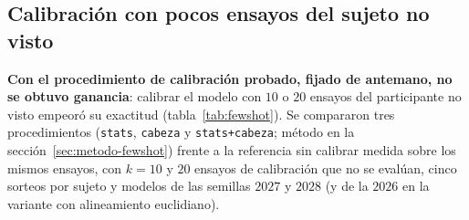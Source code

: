 \subsection{Calibración con pocos ensayos del sujeto no visto}
\label{sec:fewshot}

\textbf{Con el procedimiento de calibración probado, fijado de antemano, no se obtuvo ganancia}: calibrar el
modelo con $10$ o $20$ ensayos del participante no visto empeoró su exactitud (tabla~\ref{tab:fewshot}).
Se compararon tres procedimientos (\texttt{stats}, \texttt{cabeza} y \texttt{stats+cabeza}; método en la
sección~\ref{sec:metodo-fewshot}) frente a la referencia sin calibrar medida sobre los mismos ensayos, con
$k = 10$ y $20$ ensayos de calibración que no se evalúan, cinco sorteos por sujeto y modelos de las semillas
$2027$ y $2028$ (y de la $2026$ en la variante con alineamiento euclidiano).

